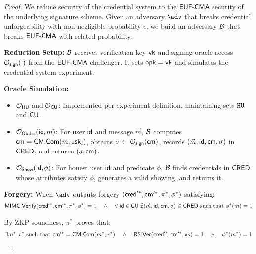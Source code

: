 \begin{proof}
We reduce security of the credential system to the $\mathsf{EUF\text{-}CMA}$ security of the underlying signature scheme. Given an adversary $\adv$ that breaks credential unforgeability with non-negligible probability $\epsilon$, we build an adversary $\mathcal{B}$ that breaks $\mathsf{EUF\text{-}CMA}$ with related probability. 

\noindent \textbf{Reduction Setup:} $\mathcal{B}$ receives verification key $\mathsf{vk}$ and signing oracle access $\mathcal{O}_{\mathsf{sign}}(\cdot)$ from the $\mathsf{EUF\text{-}CMA}$ challenger. It sets $\mathsf{opk} = \mathsf{vk}$ and simulates the credential system experiment.

\noindent  \textbf{Oracle Simulation:}
\begin{itemize}
    \item $\mathcal{O}_{\mathsf{HU}}$ and $\mathcal{O}_{\mathsf{CU}}$: Implemented per experiment definition, maintaining sets $\mathtt{HU}$ and $\mathsf{CU}$.
    
    \item $\mathcal{O}_{\mathsf{ObtIss}}(\mathsf{id}, m)$: For user $\mathsf{id}$ and message $\vec{m}$, $\mathcal{B}$ computes $\mathsf{cm} = \mathsf{CM.Com}(m; \mathsf{usk}_i)$, obtains $\sigma \gets \mathcal{O}_{\mathsf{sign}}(\mathsf{cm})$, records $(\vec{m}, \mathsf{id}, \mathsf{cm}, \sigma)$ in $\mathsf{CRED}$, and returns $(\sigma, \mathsf{cm})$.
    
    \item $\mathcal{O}_{\mathsf{Show}}(\mathsf{id}, \phi)$: For honest user $\mathsf{id}$ and predicate $\phi$, $\mathcal{B}$ finds credentials in $\mathsf{CRED}$ whose attributes satisfy $\phi$, generates a valid showing, and returns it.
\end{itemize}


\noindent \textbf{Forgery:} When $\adv$ outputs forgery $(\mathsf{cred}'^*, \mathsf{cm}'^*, \pi^*, \phi^*)$ satisfying:
\begin{align*}
\mathsf{MIMC.Verify}(\mathsf{cred}'^*, \mathsf{cm}'^*, \pi^*, \phi^*) = 1 \quad \wedge \quad \forall \; \mathsf{id} \in \mathsf{CU} \;  \nexists (\vec{m}, \mathsf{id}, \mathsf{cm}, \sigma) \in \mathsf{CRED} \text{ such that } \phi^*(\vec{m}) = 1
\end{align*}

\noindent By ZKP soundness, $\pi^*$ proves that:
\[
\exists m^*, r^* \text{ such that } \mathsf{cm}'^* = \mathsf{CM.Com}(m^*; r^*) \quad \wedge \quad \mathsf{RS.Ver}(\mathsf{cred}'^*, \mathsf{cm}'^*, \mathsf{vk}) = 1 \quad \wedge \quad \phi^*(m^*) = 1
\]


\end{proof}
